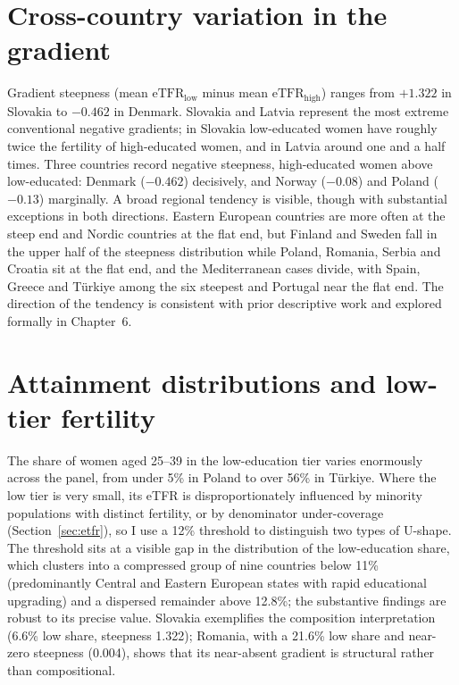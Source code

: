 \documentclass[12pt,a4paper]{report}
\begin{document}
\section{Cross-country variation in the gradient}
Gradient steepness (mean $\mathrm{eTFR}_{\text{low}}$ minus mean $\mathrm{eTFR}_{\text{high}}$)
ranges from $+1.322$ in Slovakia to $-0.462$ in Denmark. Slovakia and Latvia represent the most
extreme conventional negative gradients; in Slovakia low-educated women have roughly twice the
fertility of high-educated women, and in Latvia around one and a half times. Three countries record negative steepness, high-educated women
above low-educated: Denmark ($-0.462$) decisively, and Norway ($-0.08$) and Poland ($-0.13$)
marginally. A broad regional tendency is visible, though with substantial exceptions in both
directions. Eastern European countries are more often at the steep end and Nordic countries at the
flat end, but Finland and Sweden fall in the upper half of the steepness distribution while Poland,
Romania, Serbia and Croatia sit at the flat end, and the Mediterranean cases divide, with Spain,
Greece and T\"urkiye among the six steepest and Portugal near the flat end. The direction of the
tendency is consistent with prior descriptive work \citep{skirbekk2008,andersson2009}
and explored formally in Chapter~6.

\section{Attainment distributions and low-tier fertility}
\label{sec:attain}
The share of women aged 25--39 in the low-education tier varies enormously across the panel, from
under 5\% in Poland to over 56\% in Türkiye. Where the low tier is very small, its eTFR is
disproportionately influenced by minority populations with distinct fertility, or by denominator
under-coverage (Section~\ref{sec:etfr}), so I use a 12\% threshold
to distinguish two types of U-shape. The
threshold sits at a visible gap in the distribution of the low-education share, which clusters
into a compressed group of nine countries below 11\% (predominantly Central and Eastern European
states with rapid educational upgrading) and a dispersed remainder above 12.8\%; the substantive
findings are robust to its precise value. Slovakia
exemplifies the composition interpretation (6.6\% low share, steepness 1.322); Romania, with a 21.6\%
low share and near-zero steepness (0.004), shows
that its near-absent gradient is structural rather than compositional.
\end{document}

